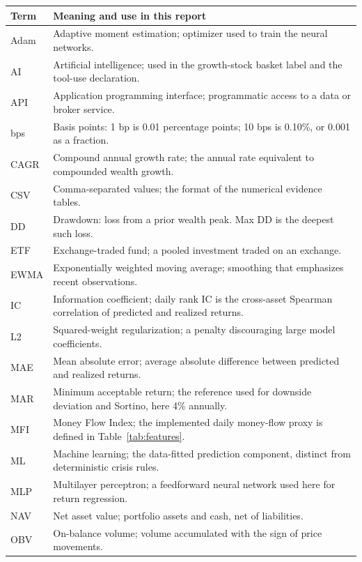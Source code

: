 \documentclass[3p,times]{elsarticle}
\begin{document}
\begingroup\small
\renewcommand{\arraystretch}{1.12}
\noindent\begin{tabularx}{\textwidth}{@{}p{}X@{}}\toprule
Term & Meaning and use in this report \\\midrule
Adam & Adaptive moment estimation; optimizer used to train the neural networks. \\
AI & Artificial intelligence; used in the growth-stock basket label and the tool-use declaration. \\
API & Application programming interface; programmatic access to a data or broker service. \\
bps & Basis points: 1 bp is 0.01 percentage points; 10 bps is 0.10\%, or 0.001 as a fraction. \\
CAGR & Compound annual growth rate; the annual rate equivalent to compounded wealth growth. \\
CSV & Comma-separated values; the format of the numerical evidence tables. \\
DD & Drawdown: loss from a prior wealth peak. Max DD is the deepest such loss. \\
ETF & Exchange-traded fund; a pooled investment traded on an exchange. \\
EWMA & Exponentially weighted moving average; smoothing that emphasizes recent observations. \\
IC & Information coefficient; daily rank IC is the cross-asset Spearman correlation of predicted and realized returns. \\
L2 & Squared-weight regularization; a penalty discouraging large model coefficients. \\
MAE & Mean absolute error; average absolute difference between predicted and realized returns. \\
MAR & Minimum acceptable return; the reference used for downside deviation and Sortino, here 4\% annually. \\
MFI & Money Flow Index; the implemented daily money-flow proxy is defined in Table~\ref{tab:features}. \\
ML & Machine learning; the data-fitted prediction component, distinct from deterministic crisis rules. \\
MLP & Multilayer perceptron; a feedforward neural network used here for return regression. \\
NAV & Net asset value; portfolio assets and cash, net of liabilities. \\
OBV & On-balance volume; volume accumulated with the sign of price movements. \\

\end{tabularx}
\end{document}
